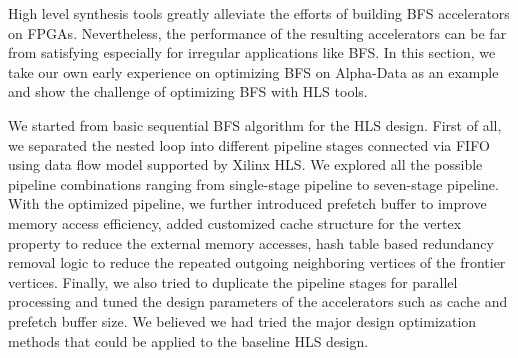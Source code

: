 
High level synthesis tools greatly alleviate the efforts of building BFS accelerators on FPGAs. 
Nevertheless, the performance of the resulting accelerators can be far from satisfying 
especially for irregular applications like BFS. In this section, we take our own early experience 
on optimizing BFS on Alpha-Data as an example and show the challenge of 
optimizing BFS with HLS tools. 


We started from basic sequential BFS algorithm for 
the HLS design. First of all, we separated the nested loop into different pipeline 
stages connected via FIFO using data flow model supported by Xilinx HLS. 
We explored all the possible pipeline combinations ranging from single-stage 
pipeline to seven-stage pipeline. With the optimized pipeline, we further 
introduced prefetch buffer to improve memory access efficiency, 
added customized cache structure for the vertex property to reduce the external 
memory accesses, hash table based redundancy removal logic to reduce the repeated 
outgoing neighboring vertices of the frontier vertices. Finally, we also tried to 
duplicate the pipeline stages for parallel processing and tuned the design parameters 
of the accelerators such as cache and prefetch buffer size. We believed 
we had tried the major design optimization methods that could be applied to the 
baseline HLS design. 

%
%
%


